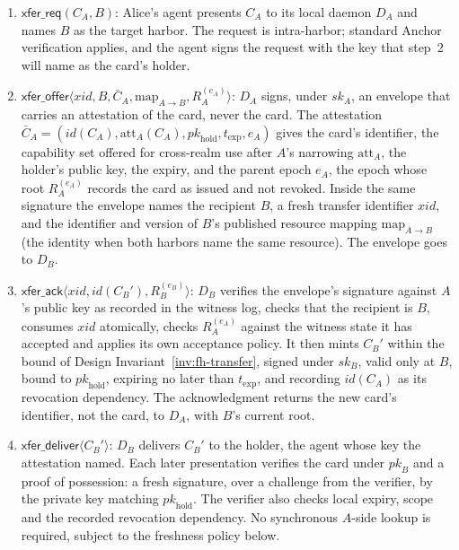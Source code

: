 \documentclass[11pt,a4paper]{article}
\theoremstyle{definition}
\theoremstyle{remark}
\begin{document}
\begin{enumerate}[nosep,leftmargin=*]
\item $\mathsf{xfer\_req}(C_A, B)$: Alice's agent presents $C_A$ to its local daemon $D_A$ and names $B$ as the target harbor. The request is intra-harbor; standard Anchor verification applies, and the agent signs the request with the key that step~2 will name as the card's holder.

\item $\mathsf{xfer\_offer}\langle \mathit{xid}, B, \bar{C}_A, \mathrm{map}_{A\to B}, R_A^{(e_A)} \rangle$: $D_A$ signs, under $\mathit{sk}_A$, an envelope that carries an attestation of the card, never the card. The attestation $\bar{C}_A = (\mathit{id}(C_A), \mathrm{att}_A(C_A), \mathit{pk}_{\mathrm{hold}}, t_{\mathrm{exp}}, e_A)$ gives the card's identifier, the capability set offered for cross-realm use after $A$'s narrowing $\mathrm{att}_A$, the holder's public key, the expiry, and the parent epoch $e_A$, the epoch whose root $R_A^{(e_A)}$ records the card as issued and not revoked. Inside the same signature the envelope names the recipient $B$, a fresh transfer identifier $\mathit{xid}$, and the identifier and version of $B$'s published resource mapping $\mathrm{map}_{A\to B}$ (the identity when both harbors name the same resource). The envelope goes to $D_B$.

\item $\mathsf{xfer\_ack}\langle \mathit{xid}, \mathit{id}(C_B'), R_B^{(e_B)} \rangle$: $D_B$ verifies the envelope's signature against $A$'s public key as recorded in the witness log, checks that the recipient is $B$, consumes $\mathit{xid}$ atomically, checks $R_A^{(e_A)}$ against the witness state it has accepted and applies its own acceptance policy. It then mints $C_B'$ within the bound of Design Invariant~\ref{inv:fh-transfer}, signed under $\mathit{sk}_B$, valid only at $B$, bound to $\mathit{pk}_{\mathrm{hold}}$, expiring no later than $t_{\mathrm{exp}}$, and recording $\mathit{id}(C_A)$ as its revocation dependency. The acknowledgment returns the new card's identifier, not the card, to $D_A$, with $B$'s current root.

\item $\mathsf{xfer\_deliver}\langle C_B' \rangle$: $D_B$ delivers $C_B'$ to the holder, the agent whose key the attestation named. Each later presentation verifies the card under $\mathit{pk}_B$ and a proof of possession: a fresh signature, over a challenge from the verifier, by the private key matching $\mathit{pk}_{\mathrm{hold}}$. The verifier also checks local expiry, scope and the recorded revocation dependency. No synchronous $A$-side lookup is required, subject to the freshness policy below.
\end{enumerate}
\end{document}
